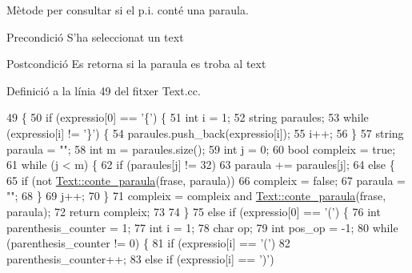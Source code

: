Mètode per consultar si el p.\+i. conté una paraula. 

\begin{DoxyPrecond}{Precondició}
S'ha seleccionat un text 
\end{DoxyPrecond}
\begin{DoxyPostcond}{Postcondició}
Es retorna si la paraula es troba al text 
\end{DoxyPostcond}


Definició a la línia 49 del fitxer Text.\+cc.


\begin{DoxyCode}
49                                                                 \{
50     \textcolor{keywordflow}{if} (expressio[0] == \textcolor{charliteral}{'\{'}) \{
51         \textcolor{keywordtype}{int} i = 1;
52         \textcolor{keywordtype}{string} paraules;
53         \textcolor{keywordflow}{while} (expressio[i] != \textcolor{charliteral}{'\}'}) \{
54             paraules.push\_back(expressio[i]);
55             i++;
56         \}
57         \textcolor{keywordtype}{string} paraula = \textcolor{stringliteral}{""};
58         \textcolor{keywordtype}{int} m = paraules.size();
59         \textcolor{keywordtype}{int} j = 0;
60         \textcolor{keywordtype}{bool} compleix = \textcolor{keyword}{true};
61         \textcolor{keywordflow}{while} (j < m) \{
62             \textcolor{keywordflow}{if} (paraules[j] != 32)
63                 paraula += paraules[j];
64             \textcolor{keywordflow}{else} \{
65                 \textcolor{keywordflow}{if} (not \hyperlink{class_text_a86b69aad96995bea56567e3450dbe25c}{Text::conte\_paraula}(frase, paraula))
66                     compleix = \textcolor{keyword}{false};
67                 paraula = \textcolor{stringliteral}{""};
68             \}
69             j++;
70         \}
71         compleix = compleix and \hyperlink{class_text_a86b69aad96995bea56567e3450dbe25c}{Text::conte\_paraula}(frase, paraula);
72         \textcolor{keywordflow}{return} compleix;
73 
74     \}
75     \textcolor{keywordflow}{else} \textcolor{keywordflow}{if} (expressio[0] == \textcolor{charliteral}{'('}) \{
76         \textcolor{keywordtype}{int} parenthesis\_counter = 1;
77         \textcolor{keywordtype}{int} i = 1;
78         \textcolor{keywordtype}{char} op;
79         \textcolor{keywordtype}{int} pos\_op = -1;
80         \textcolor{keywordflow}{while} (parenthesis\_counter != 0) \{
81             \textcolor{keywordflow}{if} (expressio[i] == \textcolor{charliteral}{'('})
82                 parenthesis\_counter++;
83             \textcolor{keywordflow}{else} \textcolor{keywordflow}{if} (expressio[i] == \textcolor{charliteral}{')'})

\end{DoxyCode}
